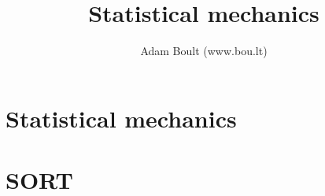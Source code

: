\documentclass[oneside]{book}
\begin{document}
\author{Adam Boult (www.bou.lt)}
\title{Statistical mechanics}
\maketitle

\setcounter{tocdepth}{0}
\tableofcontents



\part{Statistical mechanics}


\part{SORT}

\end{document}
